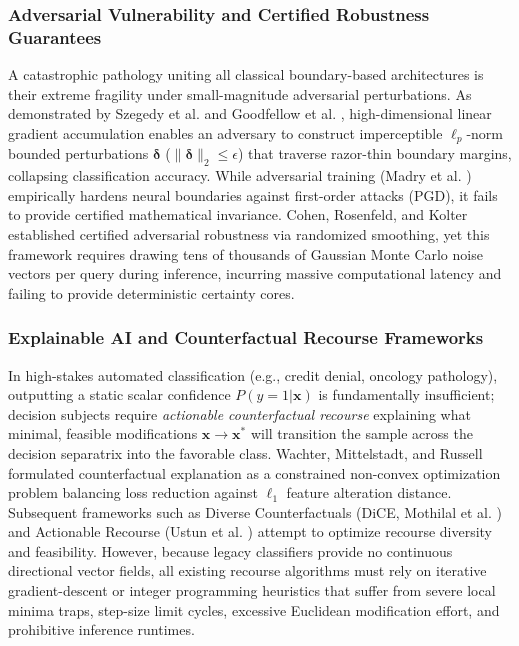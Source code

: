 \documentclass[preprint,review,12pt]{elsarticle}
\begin{document}
\subsubsection{Adversarial Vulnerability and Certified Robustness Guarantees}
A catastrophic pathology uniting all classical boundary-based architectures is their extreme fragility under small-magnitude adversarial perturbations. As demonstrated by Szegedy et al. \cite{szegedy2014intriguing} and Goodfellow et al. \cite{goodfellow2014explaining}, high-dimensional linear gradient accumulation enables an adversary to construct imperceptible $\ell_p$-norm bounded perturbations $\boldsymbol{\delta}$ ($\|\boldsymbol{\delta}\|_2 \le \epsilon$) that traverse razor-thin boundary margins, collapsing classification accuracy. While adversarial training (Madry et al. \cite{madry2018towards}) empirically hardens neural boundaries against first-order attacks (PGD), it fails to provide certified mathematical invariance. Cohen, Rosenfeld, and Kolter \cite{cohen2019certified} established certified adversarial robustness via randomized smoothing, yet this framework requires drawing tens of thousands of Gaussian Monte Carlo noise vectors per query during inference, incurring massive computational latency and failing to provide deterministic certainty cores.

\subsubsection{Explainable AI and Counterfactual Recourse Frameworks}
In high-stakes automated classification (e.g., credit denial, oncology pathology), outputting a static scalar confidence $P(y=1|\mathbf{x})$ is fundamentally insufficient; decision subjects require \emph{actionable counterfactual recourse} explaining what minimal, feasible modifications $\mathbf{x} \to \mathbf{x}^*$ will transition the sample across the decision separatrix into the favorable class. Wachter, Mittelstadt, and Russell \cite{wachter2017counterfactual} formulated counterfactual explanation as a constrained non-convex optimization problem balancing loss reduction against $\ell_1$ feature alteration distance. Subsequent frameworks such as Diverse Counterfactuals (DiCE, Mothilal et al. \cite{mothilal2020explaining}) and Actionable Recourse (Ustun et al. \cite{ustun2019actionable}) attempt to optimize recourse diversity and feasibility. However, because legacy classifiers provide no continuous directional vector fields, all existing recourse algorithms must rely on iterative gradient-descent or integer programming heuristics that suffer from severe local minima traps, step-size limit cycles, excessive Euclidean modification effort, and prohibitive inference runtimes.
\end{document}
